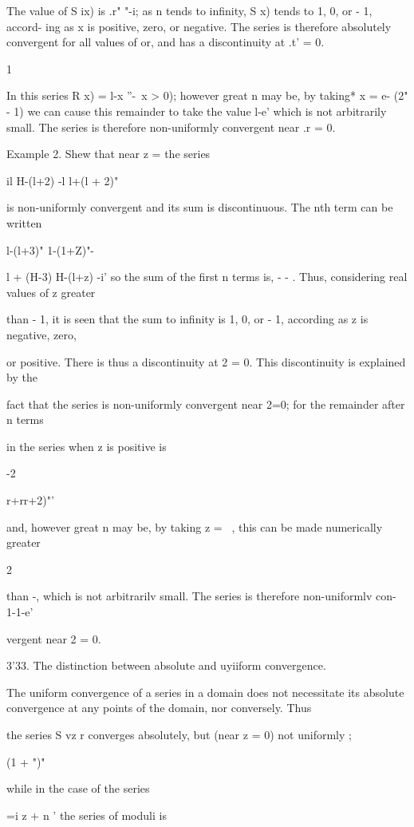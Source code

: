 The value of S ix) is .r" "-i; as n tends to infinity, S x) tends to
1, 0, or - 1, accord- ing as x is positive, zero, or negative. The
series is therefore absolutely convergent for all values of or, and
has a discontinuity at .t' = 0.

%
%

1

In this series R x) = l-x ''-\ x > 0); however great n may be, by
taking* x = e- (2" - 1) we can cause this remainder to take the value
l-e' which is not arbitrarily small. The series is therefore
non-uniformly convergent near .r = 0.

Example 2. Shew that near z = the series

 il H-(l+2) -l l+(l + 2)"

is non-uniformly convergent and its sum is discontinuous. The nth term
can be written

l-(l+3)" 1-(1+Z)"-

l + (H-3) H-(l+z) -i' so the sum of the first n terms is, - - . Thus,
considering real values of z greater

than - 1, it is seen that the sum to infinity is 1, 0, or - 1,
according as z is negative, zero,

or positive. There is thus a discontinuity at 2 = 0. This
discontinuity is explained by the

fact that the series is non-uniformly convergent near 2=0; for the
remainder after n terms

in the series when z is positive is

-2

r+rr+2)"'

and, however great n may be, by taking z = ~, this can be made
numerically greater

2

than -, which is not arbitrarilv small. The series is therefore
non-uniformlv con- 1-1-e'

vergent near 2 = 0.

3'33. The distinction between absolute and uyiiform convergence.

The uniform convergence of a series in a domain does not necessitate
its absolute convergence at any points of the domain, nor conversely.
Thus

the series S vz r converges absolutely, but (near z = 0) not uniformly
;

(1 + ")"

while in the case of the series

 =i z + n ' the series of moduli is

